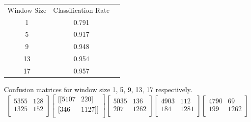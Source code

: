 \documentclass[12pt,a4paper]{article}
\begin{document}
\begin{center}
\begin{tabular}{ c c c }
Window Size & Classification Rate \\
 1 & 0.791 \\
 5 & 0.917 \\
 9 & 0.948 \\
 13 &0.954 \\
 17 &0.957 \\
\end{tabular}
\end{center}
Confusion matrices for window size 1, 5, 9, 13, 17 respectively.  
\[
  \begin{bmatrix}
  5355  &128\\
 1325  &152 \\
  \end{bmatrix} 
  \begin{bmatrix}
  [[5107 & 220] \\
 [ 346 &1127]] \\
   \end{bmatrix}
  \begin{bmatrix}
  5035 & 136 \\
 207 &1262 \\
   \end{bmatrix}
  \begin{bmatrix}
4903  &112 \\
 184 &1281\\
   \end{bmatrix}
  \begin{bmatrix}
4790  & 69 \\
199 &1262 \\
   \end{bmatrix}
\]
\end{document}
